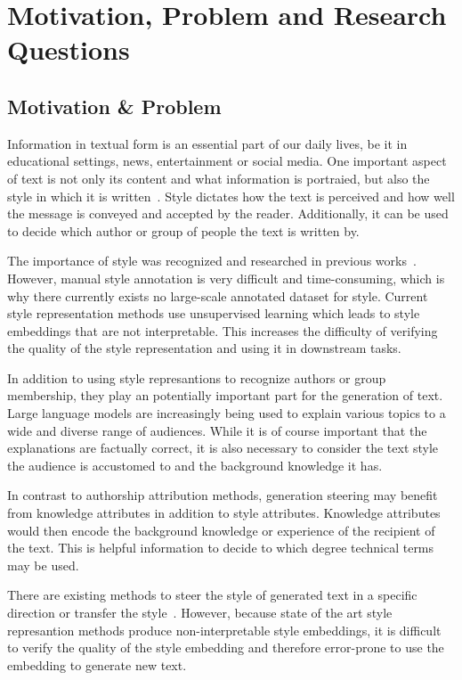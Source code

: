 
\section{Motivation, Problem and Research Questions}

\subsection{Motivation \& Problem}
Information in textual form is an essential part of our daily lives, be it in educational settings, news, entertainment or social media. One important aspect of text is not only its content and what information is portraied, but also the style in which it is written~\cite{wegmannSameAuthorJust2022}. Style dictates how the text is perceived and how well the message is conveyed and accepted by the reader. Additionally, it can be used to decide which author or group of people the text is written by.

The importance of style was recognized and researched in previous works~\cite{zhu-etal-2024-styleflow, ijcai2020p526,wegmannSameAuthorJust2022}. However, manual style annotation is very difficult and time-consuming, which is why there currently exists no large-scale annotated dataset for style. Current style representation methods use unsupervised learning which leads to style embeddings that are not interpretable. This increases the difficulty of verifying the quality of the style representation and using it in downstream tasks.

In addition to using style represantions to recognize authors or group membership, they play an potentially important part for the generation of text. Large language models are increasingly being used to explain various topics to a wide and diverse range of audiences. While it is of course important that the explanations are factually correct, it is also necessary to consider the text style the audience is accustomed to and the background knowledge it has.

In contrast to authorship attribution methods, generation steering may benefit from knowledge attributes in addition to style attributes. Knowledge attributes would then encode the background knowledge or experience of the recipient of the text. This is helpful information to decide to which degree technical terms may be used.

There are existing methods to steer the style of generated text in a specific direction or transfer the style~\cite{zhu-etal-2024-styleflow, ijcai2020p526}.
However, because state of the art style represantion methods produce non-interpretable style embeddings, it is difficult to verify the quality of the style embedding and therefore error-prone to use the embedding to generate new text.


